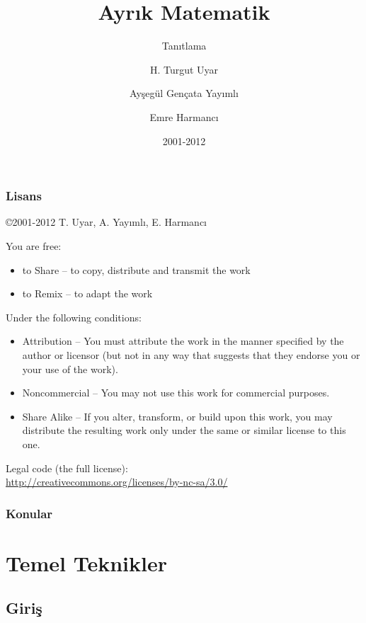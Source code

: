 \documentclass[dvipsnames]{beamer}
\title{Ayrık Matematik}
\subtitle{Tanıtlama}
\author{H. Turgut Uyar \and Ayşegül Gençata Yayımlı \and Emre Harmancı}
\date{2001-2012}
\theoremstyle{definition}
\theoremstyle{example}
\theoremstyle{plain}
\begin{document}
\begin{frame}
  \titlepage
\end{frame}

\begin{frame}
  \frametitle{Lisans}

  \hfill
  \copyright 2001-2012 T. Uyar, A. Yayımlı, E. Harmancı

  \vfill
  \begin{tiny}
    You are free:
    \begin{itemize}
      \item to Share -- to copy, distribute and transmit the work
      \item to Remix -- to adapt the work
    \end{itemize}

    Under the following conditions:
    \begin{itemize}
      \item Attribution -- You must attribute the work in the manner specified by
        the author or licensor (but not in any way that suggests that they
        endorse you or your use of the work).

      \item Noncommercial -- You may not use this work for commercial purposes.

      \item Share Alike -- If you alter, transform, or build upon this work, you
        may distribute the resulting work only under the same or similar license
        to this one.
    \end{itemize}
  \end{tiny}

  \vfill
  Legal code (the full license):\\
  \url{http://creativecommons.org/licenses/by-nc-sa/3.0/}
\end{frame}

\begin{frame}
  \frametitle{Konular}
  \tableofcontents
\end{frame}

\section{Temel Teknikler}

\subsection{Giriş}
\end{document}
